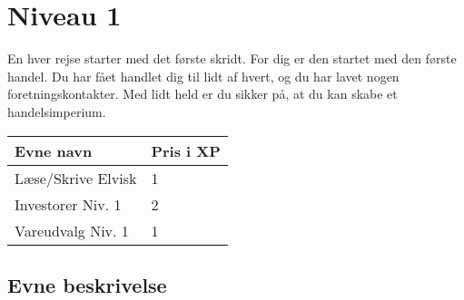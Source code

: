 \chapter{Niveau 1}
En hver rejse starter med det første skridt. For dig er den startet med den første handel. Du har fået handlet dig til lidt af hvert, og du har lavet nogen foretningskontakter. Med lidt held er du sikker på, at du kan skabe et handelsimperium.

\begin{table}[H]
    \centering
    \begin{tabular}{|p{}|p{}|}
    \rowcolor{cerulean!80}\hline
        Evne navn & Pris i XP \\\hline
         Læse/Skrive Elvisk & 1\\\hline
         Investorer Niv. 1 & 2 \\\hline
         Vareudvalg Niv. 1 & 1 \\\hline
    \end{tabular}
\end{table}

\section{Evne beskrivelse}





